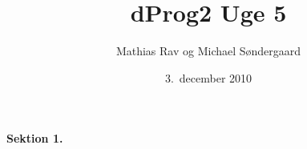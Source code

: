 \documentclass{article}
\author{Mathias Rav og Michael Søndergaard}
\title{dProg2 Uge 5}
\date{3.\ december 2010}
\begin{document}
\maketitle
\paragraph{Sektion 1.}
\end{document}
